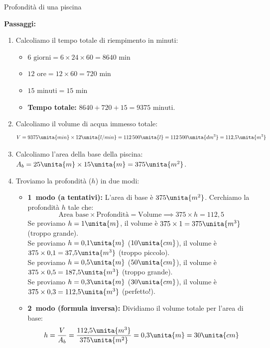 \begin{esercizio}{Profondità di una piscina}
\begin{soluzione}
  \textbf{Passaggi:}
  \begin{enumerate}
    \item Calcoliamo il tempo totale di riempimento in minuti:
    \begin{itemize}
      \item $6\text{ giorni} = 6 \times 24 \times 60 = 8640\text{ min}$
      \item $12\text{ ore} = 12 \times 60 = 720\text{ min}$
      \item $15\text{ minuti} = 15\text{ min}$
      \item \textbf{Tempo totale:} $8640 + 720 + 15 = 9375\text{ minuti}$.
    \end{itemize}
    \item Calcoliamo il volume di acqua immesso totale:
    \[
    V = 9375\unita{min} \times 12\unita{l/min} = 112\,500\unita{l} = 112\,500\unita{dm^3} = 112{,}5\unita{m^3}
    \]
    \item Calcoliamo l'area della base della piscina: $A_b = 25\unita{m} \times 15\unita{m} = 375\unita{m^2}$.
    \item Troviamo la profondità ($h$) in due modi:
    \begin{itemize}
      \item \textbf{1\textdegree\ modo (a tentativi):} L'area di base è $375\unita{m^2}$. Cerchiamo la profondità $h$ tale che:
      \[
      \text{Area base} \times \text{Profondità} = \text{Volume} \implies 375 \times h = 112{,}5
      \]
      Se proviamo $h = 1\unita{m}$, il volume è $375 \times 1 = 375\unita{m^3}$ (troppo grande).\\
      Se proviamo $h = 0{,}1\unita{m}$ ($10\unita{cm}$), il volume è $375 \times 0{,}1 = 37{,}5\unita{m^3}$ (troppo piccolo).\\
      Se proviamo $h = 0{,}5\unita{m}$ ($50\unita{cm}$), il volume è $375 \times 0{,}5 = 187{,}5\unita{m^3}$ (troppo grande).\\
      Se proviamo $h = 0{,}3\unita{m}$ ($30\unita{cm}$), il volume è $375 \times 0{,}3 = 112{,}5\unita{m^3}$ (perfetto!).
      \item \textbf{2\textdegree\ modo (formula inversa):} Dividiamo il volume totale per l'area di base:
      \[
      h = \frac{V}{A_b} = \frac{112{,}5\unita{m^3}}{375\unita{m^2}} = 0{,}3\unita{m} = 30\unita{cm}
      \]
    \end{itemize}
  \end{enumerate}
\end{soluzione}
\end{esercizio}
